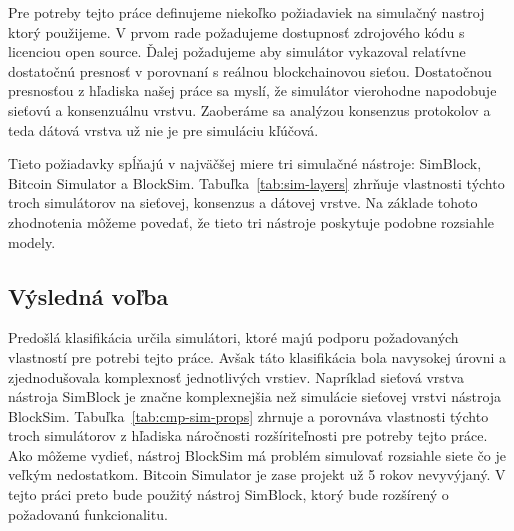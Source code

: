 Pre potreby tejto práce definujeme niekoľko požiadaviek na simulačný nastroj ktorý použijeme. V prvom rade požadujeme dostupnosť zdrojového kódu s licenciou open source. Ďalej požadujeme aby simulátor vykazoval relatívne dostatočnú presnosť v porovnaní s reálnou blockchainovou sieťou. Dostatočnou presnosťou z hľadiska našej práce sa myslí, že simulátor vierohodne napodobuje sieťovú a konsenzuálnu vrstvu. Zaoberáme sa analýzou konsenzus protokolov a teda dátová vrstva už nie je pre simuláciu kľúčová. 

Tieto požiadavky spĺňajú v najväčšej miere tri simulačné nástroje: SimBlock, Bitcoin Simulator a BlockSim. Tabuľka~\ref{tab:sim-layers} zhrňuje vlastnosti týchto troch simulátorov na sieťovej, konsenzus a dátovej vrstve. Na základe tohoto zhodnotenia môžeme povedať, že tieto tri nástroje poskytuje podobne rozsiahle modely.

\subsection{Výsledná voľba}

Predošlá klasifikácia určila simulátori, ktoré majú podporu požadovaných vlastností pre potrebi tejto práce. Avšak táto klasifikácia bola navysokej úrovni a zjednodušovala komplexnosť jednotlivých vrstiev. Napríklad sieťová vrstva nástroja SimBlock je značne komplexnejšia než simulácie sieťovej vrstvi nástroja BlockSim. Tabuľka~\ref{tab:cmp-sim-props} zhrnuje a porovnáva vlastnosti týchto troch simulátorov z hľadiska náročnosti rozšíriteľnosti pre potreby tejto práce. Ako môžeme vydieť, nástroj BlockSim má problém simulovať rozsiahle siete čo je veľkým nedostatkom. Bitcoin Simulator je zase projekt už 5 rokov nevyvýjaný. V tejto práci preto bude použitý nástroj SimBlock, ktorý bude rozšírený o požadovanú funkcionalitu. 


